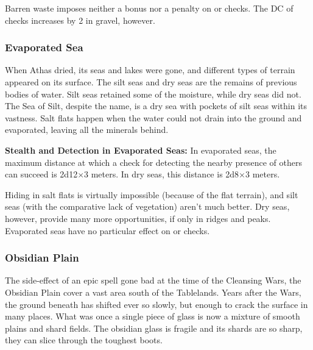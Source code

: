 Barren waste imposes neither a bonus nor a penalty on  or  checks. The DC of  checks increases by 2 in gravel, however.


\subsubsection{Evaporated Sea}
When Athas dried, its seas and lakes were gone, and different types of terrain appeared on its surface. The silt seas and dry seas are the remains of previous bodies of water. Silt seas retained some of the moisture, while dry seas did not. The Sea of Silt, despite the name, is a dry sea with pockets of silt seas within its vastness. Salt flats happen when the water could not drain into the ground and evaporated, leaving all the minerals behind.


\textbf{Stealth and Detection in Evaporated Seas:} In evaporated seas, the maximum distance at which a  check for detecting the nearby presence of others can succeed is 2d12$\times$3 meters. In dry seas, this distance is 2d8$\times$3 meters.

Hiding in salt flats is virtually impossible (because of the flat terrain), and silt seas (with the comparative lack of vegetation) aren't much better. Dry seas, however, provide many more opportunities, if only in ridges and peaks. Evaporated seas have no particular effect on  or  checks.

\subsubsection{Obsidian Plain}
The side-effect of an epic spell gone bad at the time of the Cleansing Wars, the Obsidian Plain cover a vast area south of the Tablelands. Years after the Wars, the ground beneath has shifted ever so slowly, but enough to crack the surface in many places. What was once a single piece of glass is now a mixture of smooth plains and shard fields. The obsidian glass is fragile and its shards are so sharp, they can slice through the toughest boots.

